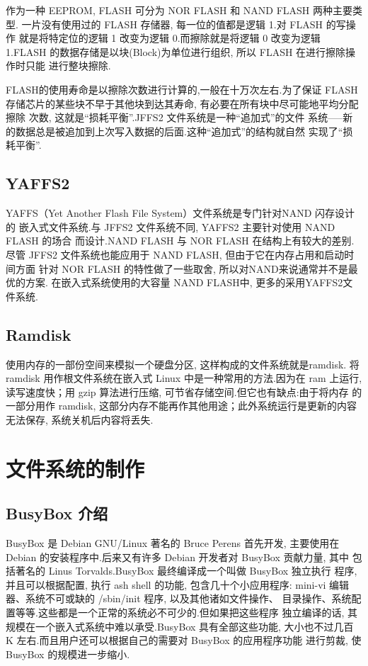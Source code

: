 	作为一种 EEPROM, FLASH 可分为 NOR FLASH 和 NAND FLASH 两种主要类型.
一片没有使用过的 FLASH 存储器, 每一位的值都是逻辑 1.对 FLASH 的写操作
就是将特定位的逻辑 1 改变为逻辑 0.而擦除就是将逻辑 0 改变为逻辑 1.FLASH
的数据存储是以块(Block)为单位进行组织, 所以 FLASH 在进行擦除操作时只能
进行整块擦除.

	FLASH的使用寿命是以擦除次数进行计算的,一般在十万次左右.为了保证 FLASH
存储芯片的某些块不早于其他块到达其寿命, 有必要在所有块中尽可能地平均分配擦除
次数, 这就是``损耗平衡''.JFFS2 文件系统是一种``追加式''的文件
系统-----新的数据总是被追加到上次写入数据的后面.这种``追加式''的结构就自然
实现了``损耗平衡''.

\subsection{YAFFS2}
	YAFFS（Yet Another Flash File System）文件系统是专门针对NAND 闪存设计的
嵌入式文件系统.与 JFFS2 文件系统不同, YAFFS2 主要针对使用 NAND FLASH 的场合
而设计.NAND FLASH 与 NOR FLASH 在结构上有较大的差别.
尽管 JFFS2 文件系统也能应用于 NAND FLASH, 但由于它在内存占用和启动时间方面
针对 NOR FLASH 的特性做了一些取舍, 所以对NAND来说通常并不是最优的方案.
在嵌入式系统使用的大容量 NAND FLASH中, 更多的采用YAFFS2文件系统.


\subsection{Ramdisk}
	使用内存的一部份空间来模拟一个硬盘分区, 这样构成的文件系统就是ramdisk.
将 ramdisk 用作根文件系统在嵌入式 Linux 中是一种常用的方法.因为在 ram 上运行, 
读写速度快；用 gzip 算法进行压缩, 可节省存储空间.但它也有缺点:由于将内存
的一部分用作 ramdisk, 这部分内存不能再作其他用途；此外系统运行是更新的内容
无法保存, 系统关机后内容将丢失.

\section{文件系统的制作}

\subsection{BusyBox 介绍}
	BusyBox 是 Debian GNU/Linux 著名的 Bruce Perens 首先开发, 主要使用在
Debian 的安装程序中.后来又有许多 Debian 开发者对 BusyBox 贡献力量, 其中
包括著名的 Linus Torvalds.BusyBox 最终编译成一个叫做 BusyBox 独立执行
程序, 并且可以根据配置, 执行 ash shell 的功能, 包含几十个小应用程序:
mini-vi 编辑器、系统不可或缺的 /sbin/init 程序, 以及其他诸如文件操作、
目录操作、系统配置等等.这些都是一个正常的系统必不可少的.但如果把这些程序
独立编译的话, 其规模在一个嵌入式系统中难以承受.BusyBox 具有全部这些功能, 
大小也不过几百 K 左右.而且用户还可以根据自己的需要对 BusyBox 的应用程序功能
进行剪裁, 使 BusyBox 的规模进一步缩小.


